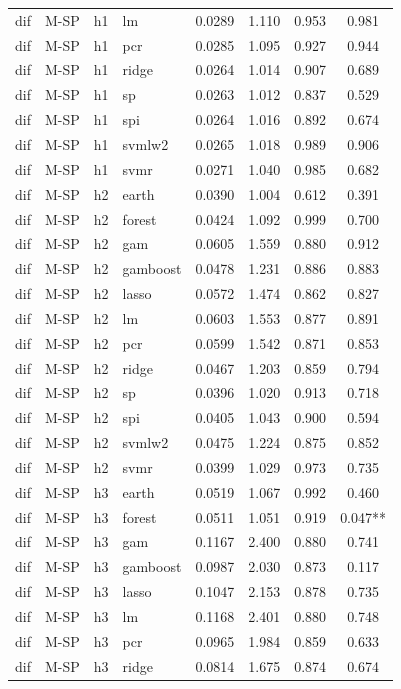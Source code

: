 \begin{ThreePartTable}
\begin{longtable}[t]{llclcccc}
dif & M-SP & h1 & lm & 0.0289 & 1.110 & 0.953 & 0.981\\
dif & M-SP & h1 & pcr & 0.0285 & 1.095 & 0.927 & 0.944\\
dif & M-SP & h1 & ridge & 0.0264 & 1.014 & 0.907 & 0.689\\
dif & M-SP & h1 & sp & 0.0263 & 1.012 & 0.837 & 0.529\\
dif & M-SP & h1 & spi & 0.0264 & 1.016 & 0.892 & 0.674\\
dif & M-SP & h1 & svmlw2 & 0.0265 & 1.018 & 0.989 & 0.906\\
dif & M-SP & h1 & svmr & 0.0271 & 1.040 & 0.985 & 0.682\\
\addlinespace
dif & M-SP & h2 & earth & 0.0390 & 1.004 & 0.612 & 0.391\\
dif & M-SP & h2 & forest & 0.0424 & 1.092 & 0.999 & 0.700\\
dif & M-SP & h2 & gam & 0.0605 & 1.559 & 0.880 & 0.912\\
dif & M-SP & h2 & gamboost & 0.0478 & 1.231 & 0.886 & 0.883\\
dif & M-SP & h2 & lasso & 0.0572 & 1.474 & 0.862 & 0.827\\
dif & M-SP & h2 & lm & 0.0603 & 1.553 & 0.877 & 0.891\\
dif & M-SP & h2 & pcr & 0.0599 & 1.542 & 0.871 & 0.853\\
dif & M-SP & h2 & ridge & 0.0467 & 1.203 & 0.859 & 0.794\\
dif & M-SP & h2 & sp & 0.0396 & 1.020 & 0.913 & 0.718\\
dif & M-SP & h2 & spi & 0.0405 & 1.043 & 0.900 & 0.594\\
dif & M-SP & h2 & svmlw2 & 0.0475 & 1.224 & 0.875 & 0.852\\
dif & M-SP & h2 & svmr & 0.0399 & 1.029 & 0.973 & 0.735\\
\addlinespace
dif & M-SP & h3 & earth & 0.0519 & 1.067 & 0.992 & 0.460\\
dif & M-SP & h3 & forest & 0.0511 & 1.051 & 0.919 & 0.047**\\
dif & M-SP & h3 & gam & 0.1167 & 2.400 & 0.880 & 0.741\\
dif & M-SP & h3 & gamboost & 0.0987 & 2.030 & 0.873 & 0.117\\
dif & M-SP & h3 & lasso & 0.1047 & 2.153 & 0.878 & 0.735\\
dif & M-SP & h3 & lm & 0.1168 & 2.401 & 0.880 & 0.748\\
dif & M-SP & h3 & pcr & 0.0965 & 1.984 & 0.859 & 0.633\\
dif & M-SP & h3 & ridge & 0.0814 & 1.675 & 0.874 & 0.674\\

\end{longtable}
\end{ThreePartTable}
